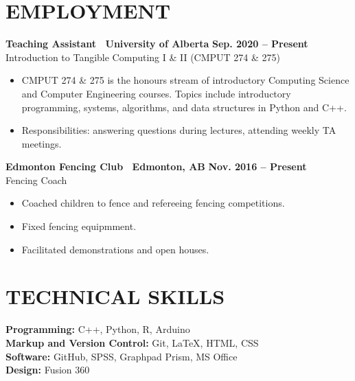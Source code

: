 \documentclass{article}
\begin{document}
\section*{\textcolor{my_colour}{EMPLOYMENT}}
\vspace{-.25em} \hrulefill \vspace{.75em}

    \textbf{Teaching Assistant \textbar\ University of Alberta} \hfill \textbf{Sep. 2020 -- Present}\\
    Introduction to Tangible Computing I \& II (CMPUT 274 \& 275)
    \begin{itemize}
        \item CMPUT 274 \& 275 is the honours stream of introductory Computing Science and Computer Engineering courses. Topics include introductory programming, systems, algorithms, and data structures in Python and C++.
        \item Responsibilities: answering questions during lectures, attending weekly TA meetings.
    \end{itemize}

    \textbf{Edmonton Fencing Club \textbar\ Edmonton, AB} \hfill \textbf{Nov. 2016 -- Present}\\
    Fencing  Coach
    \begin{itemize}
        \item Coached children to fence and refereeing fencing competitions.
        \item Fixed fencing equipmment.
        \item Facilitated demonstrations and open houses.
    \end{itemize}


\section*{\textcolor{my_colour}{TECHNICAL SKILLS}}
\vspace{-.25em} \hrulefill \vspace{.75em}

\textbf{Programming:} C++, Python, R, Arduino\\
\textbf{Markup and Version Control:} Git, \LaTeX, HTML, CSS\\
\textbf{Software:} GitHub, SPSS, Graphpad Prism, MS Office\\
\textbf{Design:} Fusion 360
\end{document}
